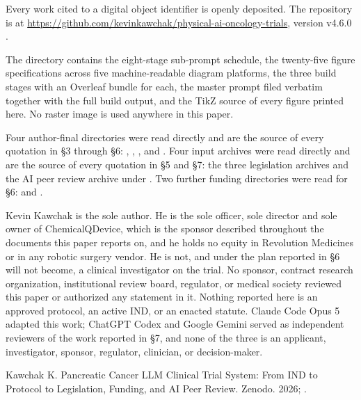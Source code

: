 
{\sloppy Every work cited to a digital object identifier is openly deposited.
The repository is at
\url{https://github.com/kevinkawchak/physical-ai-oncology-trials},
version v4.6.0 \cite{repo2026}.\par} The directory
 contains the eight-stage sub-prompt schedule, the
twenty-five figure specifications across five machine-readable diagram
platforms, the three build stages with an Overleaf bundle for each, the master
prompt filed verbatim together with the full build output, and the TikZ source
of every figure printed here. No raster image is used anywhere in this paper.

Four author-final directories were read directly and are the source of every
quotation in \S3 through \S6:
,
,
, and
. Four input
archives were read directly and are the source of every quotation in \S5 and
\S7: the three legislation archives and the AI peer review archive under
. Two further funding directories were read for
\S6:  and
.


Kevin Kawchak is the sole author. He is the sole officer, sole director and sole
owner of ChemicalQDevice, which is the sponsor described throughout the
documents this paper reports on, and he holds no equity in Revolution Medicines
or in any robotic surgery vendor. He is not, and under the plan reported in
\S6 will not become, a clinical investigator on the trial. No sponsor, contract
research organization, institutional review board, regulator, or medical society
reviewed this paper or authorized any statement in it. Nothing reported here is
an approved protocol, an active IND, or an enacted statute. Claude Code Opus 5
adapted this work; ChatGPT Codex and Google Gemini served as independent
reviewers of the work reported in \S7, and none of the three is an applicant,
investigator, sponsor, regulator, clinician, or decision-maker.


Kawchak K. Pancreatic Cancer LLM Clinical Trial System: From IND to Protocol to
Legislation, Funding, and AI Peer Review. Zenodo. 2026;
.

\vspace{0.2em}
\apprule{0.5pt}
\vspace{-0.1em}

\vspace{-0.35em}
\begin{apprefs}


\end{apprefs}
